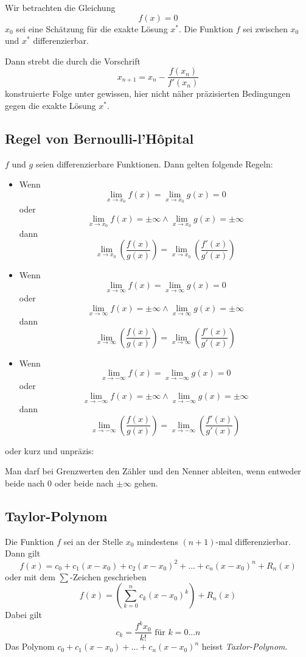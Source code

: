 Wir betrachten die Gleichung
%
\begin{displaymath}
f(x) = 0
\end{displaymath}
%
$x_0$ sei eine Schätzung für die exakte Lösung $x^*$. Die Funktion $f$ sei zwischen $x_0$ und $x^*$
differenzierbar.

Dann strebt die durch die Vorschrift
%
\begin{displaymath}
	x_{n+1} = x_n - \frac{f(x_n)}{f'(x_n)}
\end{displaymath}
%
konstruierte Folge unter gewissen, hier nicht näher präzisierten Bedingungen gegen die exakte Lösung
$x^*$.


\subsection{Regel von Bernoulli-l'Hôpital}

$f$ und $g$ seien differenzierbare Funktionen. Dann gelten folgende Regeln:

\begin{itemize}
	\item Wenn \[\lim_{x \to x_0}f(x) = \lim_{x \to x_0}g(x) = 0\]
	oder \[\lim_{x \to x_0}f(x) = \pm \infty \wedge \lim_{x \to x_0}g(x) = \pm \infty\]
	dann \[\lim_{x \to x_0}\left(\frac{f(x)}{g(x)}\right) = \lim_{x \to x_0}\left(\frac{f'(x)}{g'(x)}\right)\]
	\item Wenn \[\lim_{x \to \infty}f(x) = \lim_{x \to \infty}g(x) = 0\]
	oder \[\lim_{x \to \infty}f(x) = \pm \infty \wedge \lim_{x \to \infty}g(x) = \pm \infty\]
	dann \[\lim_{x \to \infty}\left(\frac{f(x)}{g(x)}\right) = \lim_{x \to \infty}\left(\frac{f'(x)}{g'(x)}\right)\]
	\item Wenn \[\lim_{x \to -\infty}f(x) = \lim_{x \to -\infty}g(x) = 0\]
	oder \[\lim_{x \to -\infty}f(x) = \pm \infty \wedge \lim_{x \to -\infty}g(x) = \pm \infty\]
	dann \[\lim_{x \to -\infty}\left(\frac{f(x)}{g(x)}\right) = \lim_{x \to -\infty}\left(\frac{f'(x)}{g'(x)}\right)\]
\end{itemize}
oder kurz und unpräzis:

Man darf bei Grenzwerten den Zähler und den Nenner ableiten, wenn entweder beide nach $0$ oder beide
nach $\pm \infty$ gehen.


\subsection{Taylor-Polynom}

Die Funktion $f$ sei an der Stelle $x_0$ mindestens $(n + 1)$-mal differenzierbar. Dann gilt
%
\begin{displaymath}
	f(x) = c_0 + c_1(x-x_0) + c_2(x-x_0)^2 + ... + c_n(x-x_0)^n + R_n(x)
\end{displaymath}
%
oder mit dem $\sum$-Zeichen geschrieben
%
\begin{displaymath}
	f(x) = \left(\sum_{k=0}^n c_k(x-x_0)^k\right) + R_n(x)
\end{displaymath}
%
Dabei gilt
%
\begin{displaymath}
	c_k = \frac{f^kx_0}{k!}\textrm{ für }k=0...n
\end{displaymath}
%
Das Polynom $c_0 + c_1(x-x_0)+...+c_n(x-x_0)^n$ heisst \textit{Taxlor-Polynom}.

